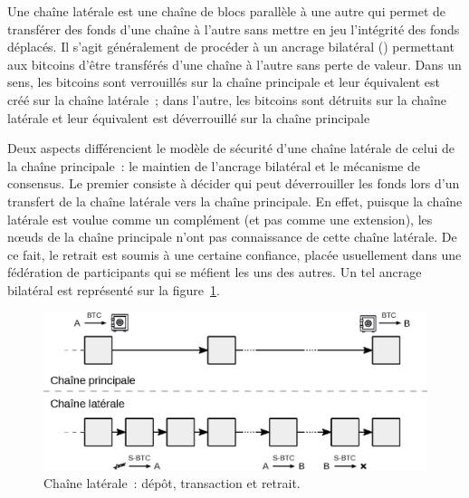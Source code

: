 
Une chaîne latérale est une chaîne de blocs parallèle à une autre qui permet de transférer des fonds d'une chaîne à l'autre sans mettre en jeu l'intégrité des fonds déplacés. Il s'agit généralement de procéder à un ancrage bilatéral () permettant aux bitcoins d'être transférés d'une chaîne à l'autre sans perte de valeur. Dans un sens, les bitcoins sont verrouillés sur la chaîne principale et leur équivalent est créé sur la chaîne latérale~; dans l'autre, les bitcoins sont détruits sur la chaîne latérale et leur équivalent est déverrouillé sur la chaîne principale

Deux aspects différencient le modèle de sécurité d'une chaîne latérale de celui de la chaîne principale~: le maintien de l'ancrage bilatéral et le mécanisme de consensus. Le premier consiste à décider qui peut déverrouiller les fonds lors d'un transfert de la chaîne latérale vers la chaîne principale. En effet, puisque la chaîne latérale est voulue comme un complément (et pas comme une extension), les nœuds de la chaîne principale n'ont pas connaissance de cette chaîne latérale. De ce fait, le retrait est soumis à une certaine confiance, placée usuellement dans une fédération de participants qui se méfient les uns des autres. Un tel ancrage bilatéral est représenté sur la figure~\ref{fig:sidechain-two-way-peg}.

\begin{figure}[ht]
  \centering
  \includegraphics[scale=0.7]{img/sidechain-two-way-peg.eps}
  \caption{Chaîne latérale~: dépôt, transaction et retrait.}
  \label{fig:sidechain-two-way-peg}
\end{figure}

